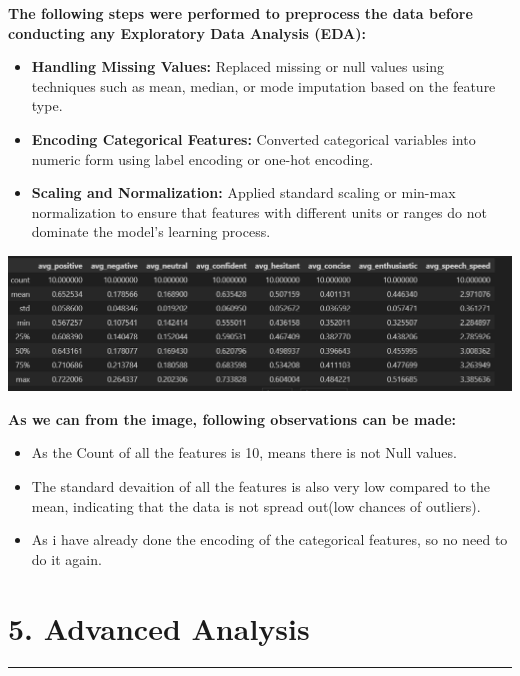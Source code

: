 \documentclass{article}
\begin{document}
\begin{tcolorbox}[colback=teal!5!white,colframe=teal!75!black,title= Steps for Data preprocessing]
\textbf{The following steps were performed to preprocess the data before conducting any Exploratory Data Analysis (EDA):}

\begin{itemize}
    \item \textbf{Handling Missing Values:} Replaced missing or null values using techniques such as mean, median, or mode imputation based on the feature type.
    \item \textbf{Encoding Categorical Features:} Converted categorical variables into numeric form using label encoding or one-hot encoding.
    \item \textbf{Scaling and Normalization:} Applied standard scaling or min-max normalization to ensure that features with different units or ranges do not dominate the model's learning process.
\end{itemize}
\begin{center}
    \includegraphics[width=1\columnwidth]{images_prompts/basic-stats.png}
\end{center}

\textbf{As we can from the image, following observations can be made:}
\begin{itemize}
    \item As the Count of all the features is 10, means there is not Null values.
    \item The standard devaition of all the features is also very low compared to the mean, indicating that the data is not spread out(low chances of outliers).
    \item As i have already done the encoding of the categorical features, so no need to do it again.
\end{itemize}

\end{tcolorbox}

\newpage

\section{5. Advanced Analysis}
  \begin{center}
        \color{red}\rule{1\linewidth}{1mm}
    \end{center}
    
\end{document}

